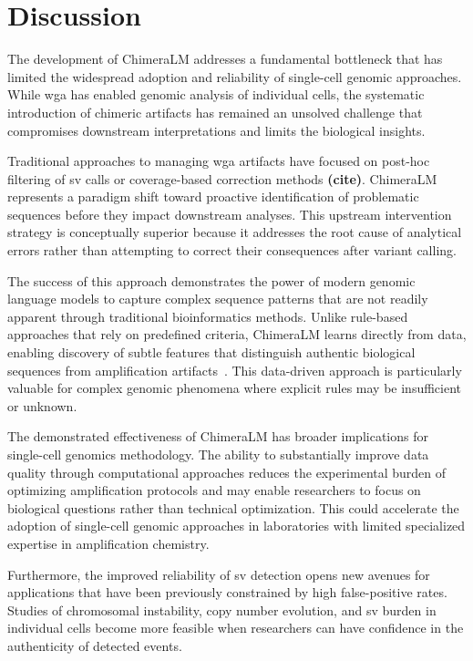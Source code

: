 \documentclass[pdflatex,sn-nature]{sn-jnl}%
\theoremstyle{thmstyleone}%
\theoremstyle{thmstyletwo}%
\theoremstyle{thmstylethree}%
\begin{document}
\section*{Discussion}
The development of ChimeraLM addresses a fundamental bottleneck that has limited the widespread adoption and reliability of single-cell genomic approaches.
While \gls{wga} has enabled genomic analysis of individual cells, the systematic introduction of chimeric artifacts has remained an unsolved challenge that compromises downstream interpretations and limits the biological insights.

Traditional approaches to managing \gls{wga} artifacts have focused on post-hoc filtering of \gls{sv} calls or coverage-based correction methods \textbf{(cite)}.
ChimeraLM represents a paradigm shift toward proactive identification of problematic sequences before they impact downstream analyses.
This upstream intervention strategy is conceptually superior because it addresses the root cause of analytical errors rather than attempting to correct their consequences after variant calling.

The success of this approach demonstrates the power of modern genomic language models to capture complex sequence patterns that are not readily apparent through traditional bioinformatics methods.
Unlike rule-based approaches that rely on predefined criteria, ChimeraLM learns directly from data, enabling discovery of subtle features that distinguish authentic biological sequences from amplification artifacts~\cite{lu2023exploration, agyabeng2025evaluating, nguyen2023hyenadna}.
This data-driven approach is particularly valuable for complex genomic phenomena where explicit rules may be insufficient or unknown.

The demonstrated effectiveness of ChimeraLM has broader implications for single-cell genomics methodology.
The ability to substantially improve data quality through computational approaches reduces the experimental burden of optimizing amplification protocols and may enable researchers to focus on biological questions rather than technical optimization.
This could accelerate the adoption of single-cell genomic approaches in laboratories with limited specialized expertise in amplification chemistry.

Furthermore, the improved reliability of \gls{sv} detection opens new avenues for applications that have been previously constrained by high false-positive rates.
Studies of chromosomal instability, copy number evolution, and \gls{sv} burden in individual cells become more feasible when researchers can have confidence in the authenticity of detected events.
\end{document}
